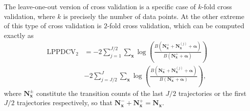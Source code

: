 \documentclass[prl,twocolumn,groupedaddress]{revtex4-1}
\newcommand{\bN}{\mathbf{N}}
\newcommand{\bx}{\mathbf{x}}
\newcommand{\balpha}{{\boldsymbol\alpha}}
\begin{document}
The leave-one-out version of cross validation is a specific case of $k$-fold cross validation, where $k$ is precisely the number of data points. At the other extreme of this type of cross validation is $2$-fold cross validation, which can be computed exactly as
\begin{align}
\textrm{LPPD}\textrm{CV}_2 &= -2\sum_{j=1}^{J/2} \sum_{\bx}  \log\left(  \frac{B(\bN^+_\bx +\bN_{\bx}^{(j)} +\balpha)}{B(\bN^+_\bx+\balpha)} \right)  \nonumber\\
& -2 \sum_{j=J/2}^{J} \sum_{\bx} \log\left(  \frac{B( \bN^-_\bx +\bN_{\bx}^{(j)} +\balpha)}{B( \bN^-_\bx +\balpha)} \right),
\end{align}
where $\bN^\pm_\bx$ constitute the transition counts of the last $J/2$ trajectories or the first $J/2$ trajectories respectively, so that $\bN^-_\bx + \bN^+_\bx = \bN_\bx$.
\end{document}
